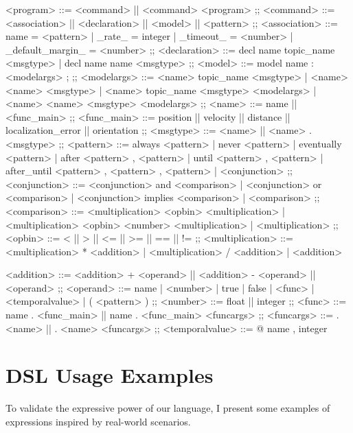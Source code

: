 \begin{bnfgrammar}
    <program> %
    ::=
    <command> || <command> <program>
    ;;
    <command> ::=
    <association>
    || <declaration>
    || <model>
    || <pattern>
    ;; 
    <association> ::=
    name = <pattern>
    | \_rate\_ = integer
    | \_timeout\_ = <number>
    | \_default\_margin\_ = <number>
    ;;
    <declaration> ::=
    decl name topic\_name <msgtype>
    | decl name name <msgtype>
    ;;
    <model> ::= 
    model name $\colon$ <modelargs> ;
    ;;
    <modelargs> ::= 
    <name> topic\_name <msgtype>
    | <name> <name> <msgtype>
    | <name> topic\_name <msgtype> <modelargs>
    | <name> <name> <msgtype> <modelargs>
    ;;
    <name> ::= 
    name || <func\_main>
    ;;
    <func\_main> ::= 
    position
    || velocity
    || distance
    || localization\_error
    || orientation
    ;;
    <msgtype> ::= 
    <name> || <name> . <msgtype>
    ;;
    <pattern> ::= 
    always <pattern>
    | never <pattern>
    | eventually <pattern>
    | after <pattern> , <pattern>
    | until <pattern> , <pattern>
    | after\_until <pattern> , <pattern> , <pattern>
    | <conjunction>
    ;;
    <conjunction> ::= 
    <conjunction> and <comparison>
    | <conjunction> or <comparison>
    | <conjunction> implies <comparison>
    | <comparison>
    ;;
    <comparison> ::= 
    <multiplication> <opbin> <multiplication>
    | <multiplication> <opbin> { <number> } <multiplication>
    | <multiplication>
    ;;
    <opbin> ::= 
    < || > || <= || >= || == || !=
    ;;
    <multiplication> ::= 
    <multiplication> * <addition>
    | <multiplication> / <addition>
    | <addition>
\end{bnfgrammar}

\begin{bnfgrammar}
    <addition> ::= <addition> + <operand>
    || <addition> - <operand>
    || <operand>
    ;;
    <operand> ::= 
    name | <number> | true | false | <func> | <temporalvalue> | ( <pattern> )
    ;;
    <number> ::= 
    float || integer
    ;;
    <func> ::= 
    name . <func\_main>
    || name . <func\_main> <funcargs>
    ;;
    <funcargs> ::= 
    . <name> || . <name> <funcargs>
    ;;
    <temporalvalue> ::= 
    @ { name , integer }
\end{bnfgrammar}

\section{DSL Usage Examples}
\label{sec:languageexamples}
To validate the expressive power of our language, I present some examples of expressions inspired by real-world scenarios.


